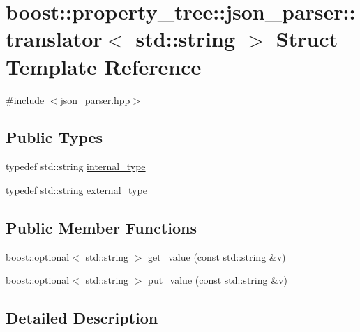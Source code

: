 \hypertarget{structboost_1_1property__tree_1_1json__parser_1_1translator_3_01std_1_1string_01_4}{\section{boost\-:\-:property\-\_\-tree\-:\-:json\-\_\-parser\-:\-:translator$<$ std\-:\-:string $>$ Struct Template Reference}
\label{structboost_1_1property__tree_1_1json__parser_1_1translator_3_01std_1_1string_01_4}
}


{\ttfamily \#include $<$json\-\_\-parser.\-hpp$>$}

\subsection*{Public Types}
\begin{DoxyCompactItemize}
\item 
typedef std\-::string \hyperlink{structboost_1_1property__tree_1_1json__parser_1_1translator_3_01std_1_1string_01_4_a0442088549debbf3d26b2506b4bd7aad}{internal\-\_\-type}
\item 
typedef std\-::string \hyperlink{structboost_1_1property__tree_1_1json__parser_1_1translator_3_01std_1_1string_01_4_a31b953272d7ddc4de96930a64e01c25a}{external\-\_\-type}
\end{DoxyCompactItemize}
\subsection*{Public Member Functions}
\begin{DoxyCompactItemize}
\item 
boost\-::optional$<$ std\-::string $>$ \hyperlink{structboost_1_1property__tree_1_1json__parser_1_1translator_3_01std_1_1string_01_4_a156c6497ef493978904665ba508226a8}{get\-\_\-value} (const std\-::string \&v)
\item 
boost\-::optional$<$ std\-::string $>$ \hyperlink{structboost_1_1property__tree_1_1json__parser_1_1translator_3_01std_1_1string_01_4_ae7eee6b74826f7b16599c38be93c0e37}{put\-\_\-value} (const std\-::string \&v)
\end{DoxyCompactItemize}


\subsection{Detailed Description}
